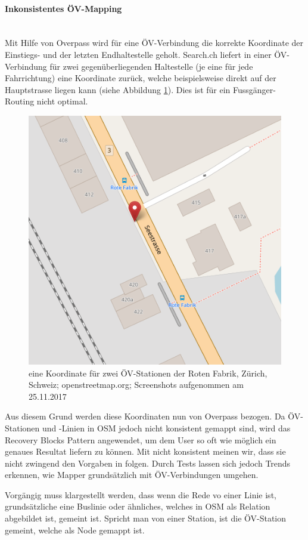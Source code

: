 \paragraph{Inkonsistentes ÖV-Mapping}\label{impl:Plaza Routing inkonsistentes ÖV-Mapping}~\\
Mit Hilfe von Overpass \cite{wiki:overpass} wird für eine ÖV-Verbindung die korrekte Koordinate der Einstiegs- und der letzten Endhaltestelle geholt. Search.ch \cite{search_ch_route_api} liefert in einer ÖV-Verbindung für zwei gegenüberliegenden Haltestelle (je eine für jede Fahrrichtung) eine Koordinate zurück, welche beispielsweise direkt auf der Hauptstrasse liegen kann (siehe Abbildung \ref{fig:one_coordinate_for_two_stops}). Dies ist für ein Fussgänger-Routing nicht optimal.

\begin{figure}[ht]
\centering
\includegraphics[width=0.5\linewidth]{projectdoc/img/one_coordinate_for_two_stops}
\caption[eine Koordinate für zwei ÖV-Stationen]{eine Koordinate für zwei ÖV-Stationen der Roten Fabrik, Zürich, Schweiz; openstreetmap.org; Screenshots aufgenommen am 25.11.2017}
\label{fig:one_coordinate_for_two_stops}
\end{figure}


Aus diesem Grund werden diese Koordinaten nun von Overpass \cite{wiki:overpass} bezogen. 
Da ÖV-Stationen und -Linien in \ac{OSM} jedoch nicht konsistent gemappt sind, wird das Recovery Blocks Pattern \cite{fault_tolerant_software} angewendet, um dem User so oft wie möglich ein genaues Resultat liefern zu können. Mit nicht konsistent meinen wir, dass sie nicht zwingend den Vorgaben in \cite{osm_wiki_relation} folgen. Durch Tests lassen sich jedoch Trends erkennen, wie Mapper grundsätzlich mit ÖV-Verbindungen umgehen.

Vorgängig muss klargestellt werden, dass wenn die Rede vo einer Linie ist, grundsätzliche eine Buslinie oder ähnliches, welches in \ac{OSM} als Relation \cite{osm_wiki_relation} abgebildet ist, gemeint ist. Spricht man von einer Station, ist die ÖV-Station gemeint, welche als Node gemappt ist.

